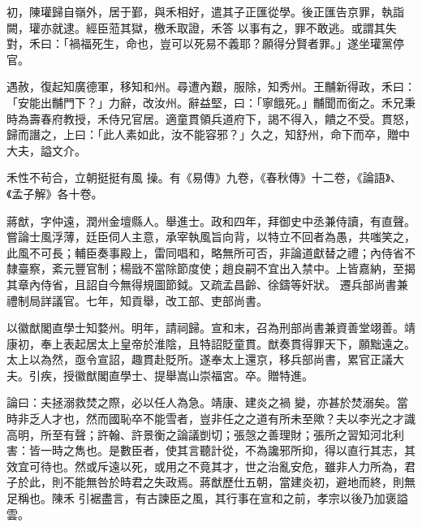 \begin{pinyinscope}
 初，陳瓘歸自嶺外，居于鄞，與禾相好，遣其子正匯從學。後正匯告京罪，執詣闕，瓘亦就逮。經臣蒞其獄，檄禾取證，禾答
 以事有之，罪不敢逃。或謂其失對，禾曰：「禍福死生，命也，豈可以死易不義耶？願得分賢者罪。」遂坐瓘黨停官。



 遇赦，復起知廣德軍，移知和州。尋遭內艱，服除，知秀州。王黼新得政，禾曰：「安能出黼門下？」力辭，改汝州。辭益堅，曰：「寧餓死。」黼聞而銜之。禾兄秉時為壽春府教授，禾侍兄官居。適童貫領兵道府下，謁不得入，饋之不受。貫怒，歸而譖之，上曰：「此人素如此，汝不能容邪？」久之，知舒州，命下而卒，贈中大夫，謚文介。



 禾性不茍合，立朝挺挺有風
 操。有《易傳》九卷，《春秋傳》十二卷，《論語》、《孟子解》各十卷。



 蔣猷，字仲遠，潤州金壇縣人。舉進士。政和四年，拜御史中丞兼侍讀，有直聲。嘗論士風浮薄，廷臣伺人主意，承宰執風旨向背，以特立不回者為愚，共嗤笑之，此風不可長；輔臣奏事殿上，雷同唱和，略無所可否，非論道獻替之禮；內侍省不隸臺察，紊元豐官制；楊戩不當除節度使；趙良嗣不宜出入禁中。上皆嘉納，至揭其章內侍省，且詔自今無得規圖節鉞。又疏孟昌齡、徐鑄等奸狀。
 遷兵部尚書兼禮制局詳議官。七年，知貢舉，改工部、吏部尚書。



 以徽猷閣直學士知婺州。明年，請祠歸。宣和末，召為刑部尚書兼資善堂翊善。靖康初，奉上表起居太上皇帝於淮陰，且特詔貶童貫。猷奏貫得罪天下，願黜遠之。太上以為然，亟令宣詔，趣貫赴貶所。遂奉太上還京，移兵部尚書，累官正議大夫。引疾，授徽猷閣直學士、提舉嵩山崇福宮。卒。贈特進。



 論曰：夫拯溺救焚之際，必以任人為急。靖康、建炎之禍
 變，亦甚於焚溺矣。當時非乏人才也，然而國恥卒不能雪者，豈非任之之道有所未至歟？夫以李光之才識高明，所至有聲；許翰、許景衡之論議剴切；張愨之善理財；張所之習知河北利害：皆一時之雋也。是數臣者，使其言聽計從，不為讒邪所抑，得以直行其志，其效宜可待也。然或斥遠以死，或用之不竟其才，世之治亂安危，雖非人力所為，君子於此，則不能無咎於時君之失政焉。蔣猷歷仕五朝，當建炎初，避地而終，則無足稱也。陳禾
 引裾盡言，有古諫臣之風，其行事在宣和之前，孝宗以後乃加褒謚雲。



\end{pinyinscope}